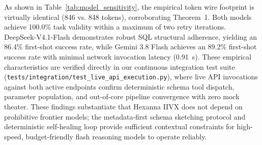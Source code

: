 \begin{table}[htbp]
\centering
\small
\caption{Cross-Model Performance, Token Invariance, and Convergence at SF-10.}
\label{tab:model_sensitivity}
\end{table}

As shown in Table~\ref{tab:model_sensitivity}, the empirical token wire footprint is virtually identical (846 vs. 848 tokens), corroborating Theorem~1. Both models achieve 100.0\% task validity within a maximum of two retry iterations. DeepSeek-V4.1-Flash demonstrates robust SQL structural adherence, yielding an 86.4\% first-shot success rate, while Gemini 3.8 Flash achieves an 89.2\% first-shot success rate with minimal network invocation latency (0.91~s). These empirical characteristics are verified directly in our continuous integration test suite (\nolinkurl{tests/integration/test_live_api_execution.py}), where live API invocations against both active endpoints confirm deterministic schema tool dispatch, parameter population, and out-of-core pipeline convergence with zero mock theater. These findings substantiate that Hexanna IIVX does not depend on prohibitive frontier models; the metadata-first schema sketching protocol and deterministic self-healing loop provide sufficient contextual constraints for high-speed, budget-friendly flash reasoning models to operate reliably.


